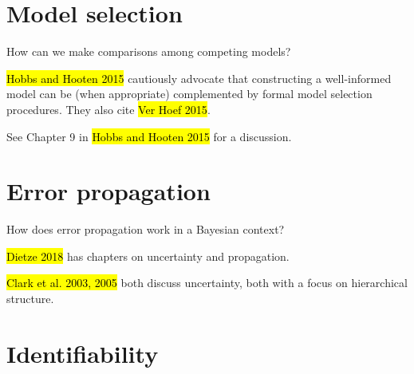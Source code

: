 \documentclass[12pt, oneside, titlepage]{article}   	%
\begin{document}
\section*{Model selection}

How can we make comparisons among competing models?

\hl{Hobbs and Hooten 2015} cautiously advocate that constructing a well-informed model can be (when appropriate) complemented by formal model selection procedures. They also cite \hl{Ver Hoef 2015}. 

See Chapter 9 in \hl{Hobbs and Hooten 2015} for a discussion. 

\section*{Error propagation}

How does error propagation work in a Bayesian context?

\hl{Dietze 2018} has chapters on uncertainty and propagation.

\hl{Clark et al. 2003, 2005} both discuss uncertainty, both with a focus on hierarchical structure.

\section*{Identifiability}


\clearpage

\end{document}
